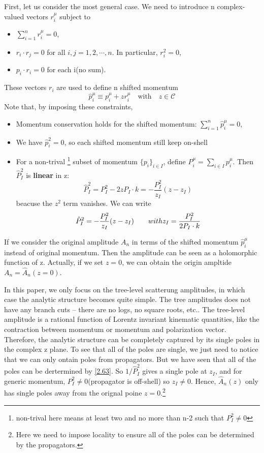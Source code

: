 \documentclass[12pt]{article}
\numberwithin{equation}{section}
\begin{document}
First, let us consider the most general case. We need to introduce n complex-valued vectors $r_i^\mu$ subject to 
\begin{itemize}
    \item $\sum_{i=1}^{n}r_i^\mu=0$,
    \item $r_i\cdot r_j=0$ for all $i,j=1,2,\cdots ,n$. In particular, $r_i^2=0$,
    \item $p_i\cdot r_i=0$ for each i(no sum).
\end{itemize}
These vectors $r_i$ are used to define n shifted momentum
\begin{equation}
    \hat{p}_i^\mu\equiv p_i^\mu+zr_i^\mu\quad \text{with}\quad z\in \mathcal{C}
    \label{2.61}
\end{equation}
Note that, by imposing these constraints,
\begin{itemize}
    \item Momentum conservation holds for the shifted momentum: $\sum_{i=1}^{n}\hat{p}_i^\mu=0$,
    \item We have $\hat{p}_i^2=0$, so each shifted momentum still keep on-shell
    \item For a non-trival \footnote{non-trival here means at least two and no more than n-2 such that $P_I^2\neq 0$} subset of momentum $\{p_i\}_{i\in I}$,
    define $P_i^\mu=\sum_{i\in I}p_i^\mu$. Then $\hat{P}_I^2$ is \textbf{linear} in z:
    \begin{equation}
        \hat{P}_I^2=P_I^2 -2zP_I\cdot k=-\frac{P_I^2}{z_I}(z-z_I)
    \end{equation}
    beacuse the $z^2$ term vanishes. We can write 
    \begin{equation}
        \hat{P}_I^2=-\frac{P_I^2}{z_I}(z-z_I)\quad \text\quad {with} z_I=\frac{P_I^2}{2P_I\cdot k}
        \label{2.63}
    \end{equation}
\end{itemize}
If we consider the original amplitude $A_n$ in terms of the shifted momentum $\hat{p}_i^\mu$ instead of original momentum. Then the amplitude can be seen as 
a holomorphic function of z. Actually, if we set $z=0$, we can obtain the origin ampltide $A_n=\hat{A}_n(z=0)$.

In this paper, we only focus on the tree-level scatterung amplitudes, in which case the analytic structure becomes quite simple. The tree amplitudes does not have any branch cuts -- there are no 
logs, no square roots, etc.. The tree-level amplitude is a rational function of Lorentz invariant kinematic quantities, like the contraction between momentum or momentum and polarization vector. 
Therefore, the analytic structure can be completely captured by its single poles in the complex z plane. To see that all of the poles are single, we just need to notice 
that we can only ontain poles from propagators. But we have seen that all of the poles can be dertermined by  \eqref{2.63}. 
So $1/\hat{P}_I^2$ gives a single pole at $z_I$, and for generic momentum, $P_I^2\neq 0$(propagator is off-shell) so $z_I\neq 0$. Hence, 
$\hat{A}_n(z)$ only has single poles away from the orignal poine $z=0$.\footnote{Here we need to impose locality to ensure all of the poles can be determined by the propagators.} 
\end{document}
